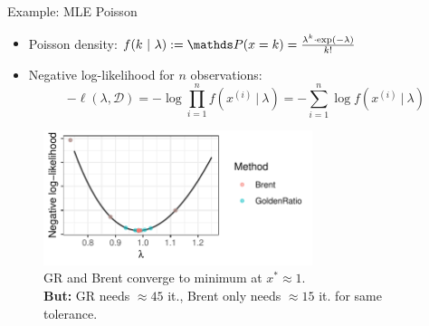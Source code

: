\documentclass[11pt,compress,t,notes=noshow, xcolor=table]{beamer}
\begin{document}
\begin{vbframe}{Example: MLE Poisson}

\begin{itemize}
    \item Poisson density: $f(k ~|~ \lambda) := \P(x = k) = \frac{\lambda^k \cdot \exp(-\lambda)}{k!}$
    \item Negative log-likelihood for $n$ observations:
        \begin{equation*}
        - \ell(\lambda, \mathcal{D}) = - \log \prod_{i = 1}^n  f\left(x^{(i)} ~|~ \lambda\right) =  - \sum_{i = 1}^n \log f\left(x^{(i)} ~|~ \lambda\right) 
        \end{equation*}
\end{itemize}

\vspace{-\baselineskip}

\begin{figure}
    \centering
    \includegraphics[width=0.7\textwidth]{figure_man/poisson.pdf}
    \caption*{\footnotesize GR and Brent converge to minimum at $x^\ast \approx 1$. \\
        \textbf{But:} GR needs $\approx 45$ it., Brent only needs $\approx 15$ it. for same tolerance.}
\end{figure}

\end{vbframe}

\endlecture
\end{document}
